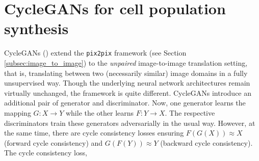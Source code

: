 %

\section{CycleGANs for cell population synthesis}
\label{sec:cycle_gans}

CycleGANs (\cite{isola2017image}) extend the \texttt{pix2pix} framework (see Section \ref{subsec:image_to_image}) to the \emph{unpaired} image-to-image translation setting, that is, translating between two (necessarily similar) image domains in a fully unsupervised way. Though the underlying neural network architectures remain virtually unchanged, the framework is quite different. CycleGANs introduce an additional pair of generator and discriminator. Now, one generator learns the mapping $G : X \to Y$ while the other learns $F : Y \to X$. The respective discriminators train these generators adversarially in the usual way. However, at the same time, there are cycle consistency losses ensuring $F(G(X)) \approx X$ (forward cycle consistency) and $G(F(Y)) \approx Y$ (backward cycle consistency). The cycle consistency loss,

